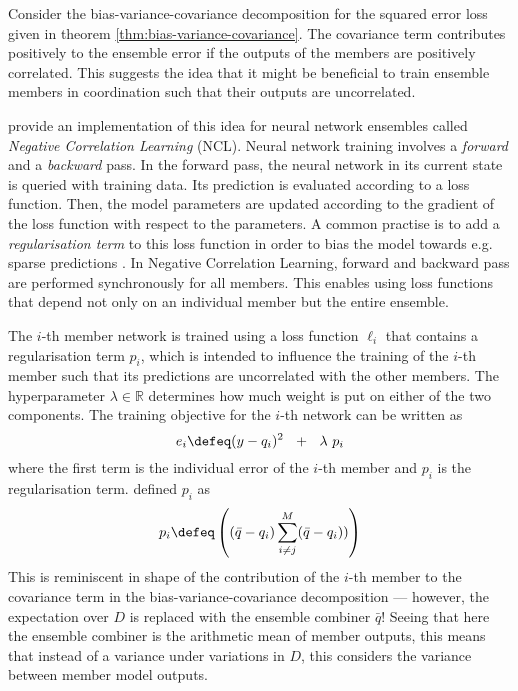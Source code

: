 \documentclass[../main.tex]{subfiles}
\begin{document}

Consider the bias-variance-covariance decomposition for the squared error loss given in theorem \ref{thm:bias-variance-covariance}.
The covariance term contributes positively to the ensemble error if the outputs of the members are positively  correlated. This suggests the idea that it might be beneficial to train ensemble members in coordination such that their outputs are uncorrelated.

\cite{LiuYao} provide an implementation of this idea for neural network ensembles called \textit{Negative Correlation Learning} (NCL).
Neural network training involves a \textit{forward} and a \textit{backward} pass. In the forward pass, the neural network in its current state is queried with training data. Its prediction is evaluated according to a loss function. 
Then, the model parameters are updated according to the gradient of the loss function with respect to the parameters. 
%
A common practise is to add a \textit{regularisation term} to this loss function in order to bias the model towards e.g. sparse predictions \cite{todo}. 
%
In Negative Correlation Learning, forward and backward pass are performed synchronously for all members. This enables using loss functions that depend not only on an individual member but the entire ensemble.

The $i$-th member network is trained using a loss function $\ell_{i}$ that contains a regularisation term $p_{i}$, which is intended to influence the training of the $i$-th member such that its predictions are uncorrelated with the other members. The hyperparameter $\lambda \in \mathbb{R}$ determines how much weight is put on either of the two components. The training objective for the $i$-th network can be written as
$$
 e_i \defeq ( y - q_{i})^2 ~ ~ + ~ ~ \lambda ~ p_{i}
$$
where the first term is the individual error of the $i$-th member and $p_i$ is the regularisation term. \cite{LiuYao} defined $p_i$ as
$$
p_{i} \defeq \left( 
(\bar{q} - q_i)
\sum_{i \not=j}^M (\bar{q} - q_i))
\right)
$$
This is reminiscent in shape of the contribution of the $i$-th member to the covariance term in the bias-variance-covariance decomposition --- however, the expectation over $D$ is replaced with the ensemble combiner $\bar{q}$! Seeing that here the ensemble combiner is the arithmetic mean of member outputs, this means that instead of a variance under variations in $D$, this considers the variance between member model outputs. 
\end{document}
